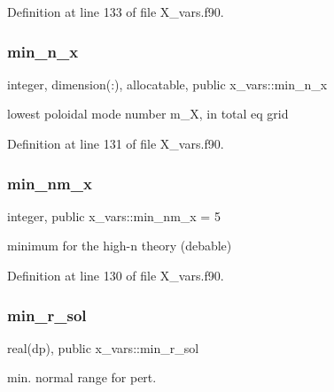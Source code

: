 Definition at line 133 of file X\+\_\+vars.\+f90.

\mbox{\label{namespacex__vars_a07485e5ebf54c236ae6f3c25e9cd2a93}} 
\subsubsection{\texorpdfstring{min\+\_\+n\+\_\+x}{min\_n\_x}}
{\footnotesize\ttfamily integer, dimension(\+:), allocatable, public x\+\_\+vars\+::min\+\_\+n\+\_\+x}



lowest poloidal mode number {\ttfamily m\+\_\+X}, in total eq grid 



Definition at line 131 of file X\+\_\+vars.\+f90.

\mbox{\label{namespacex__vars_adec89f548ba63e203297222dce675b94}} 
\subsubsection{\texorpdfstring{min\+\_\+nm\+\_\+x}{min\_nm\_x}}
{\footnotesize\ttfamily integer, public x\+\_\+vars\+::min\+\_\+nm\+\_\+x = 5}



minimum for the high-\/n theory (debable) 



Definition at line 130 of file X\+\_\+vars.\+f90.

\mbox{\label{namespacex__vars_a50c610efcf5afa4ec4b0eb7119b5d520}} 
\subsubsection{\texorpdfstring{min\+\_\+r\+\_\+sol}{min\_r\_sol}}
{\footnotesize\ttfamily real(dp), public x\+\_\+vars\+::min\+\_\+r\+\_\+sol}



min. normal range for pert. 



